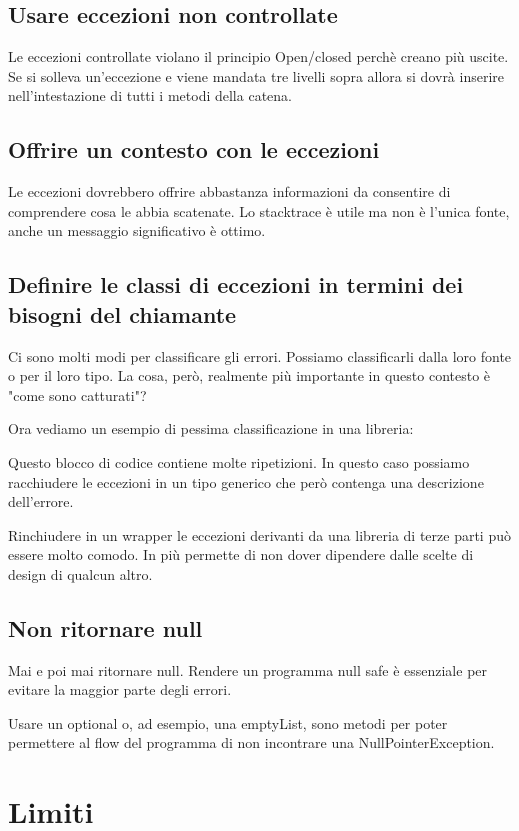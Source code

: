 \documentclass[11pt,a4paper]{book}
\begin{document}
\section{Usare eccezioni non controllate}
Le eccezioni controllate violano il principio Open/closed perchè creano più uscite. Se si solleva un'eccezione e viene mandata tre livelli sopra allora si dovrà inserire nell'intestazione di tutti i metodi della catena.

\section{Offrire un contesto con le eccezioni}
Le eccezioni dovrebbero offrire abbastanza informazioni da consentire di comprendere cosa le abbia scatenate. Lo stacktrace è utile ma non è l'unica fonte, anche un messaggio significativo è ottimo.

\section{Definire le classi di eccezioni in termini dei bisogni del chiamante}
Ci sono molti modi per classificare gli errori. Possiamo classificarli dalla loro fonte o per il loro tipo. La cosa, però, realmente più importante in questo contesto è "come sono catturati"?

Ora vediamo un esempio di pessima classificazione in una libreria:
\label{code: 044}

Questo blocco di codice contiene molte ripetizioni. In questo caso possiamo racchiudere le eccezioni in un tipo generico che però contenga una descrizione dell'errore. 

\label{code: 045}
Rinchiudere in un wrapper le eccezioni derivanti da una libreria di terze parti può essere molto comodo. In più permette di non dover dipendere dalle scelte di design di qualcun altro.

\section{Non ritornare null}
Mai e poi mai ritornare null. Rendere un programma null safe è essenziale per evitare la maggior parte degli errori.

Usare un optional o, ad esempio, una emptyList, sono metodi per poter permettere al flow del programma di non incontrare una NullPointerException.

\chapter{Limiti}
\end{document}
